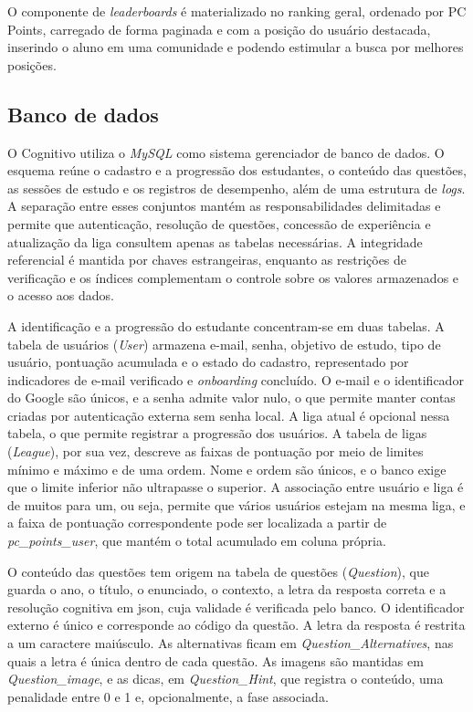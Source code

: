 O componente de \textit{leaderboards} é materializado no ranking geral, ordenado
por PC Points, carregado de forma paginada e com a posição do usuário destacada, inserindo o aluno em uma comunidade e podendo estimular a busca por
melhores posições.

\subsection{Banco de dados}
\label{sec:banco-de-dados}

O Cognitivo utiliza o \textit{MySQL} como sistema gerenciador de banco de dados. 
O esquema reúne o cadastro e a progressão dos
estudantes, o conteúdo das questões, as sessões de estudo e os registros de
desempenho, além de uma estrutura de \textit{logs}. A separação entre esses
conjuntos mantém as responsabilidades delimitadas e permite que autenticação,
resolução de questões, concessão de experiência e atualização da liga consultem
apenas as tabelas necessárias. A integridade referencial é mantida por chaves
estrangeiras, enquanto as restrições de verificação e os índices complementam o
controle sobre os valores armazenados e o acesso aos dados.

A identificação e a progressão do estudante concentram-se em duas tabelas. A
tabela de usuários (\textit{User}) armazena e-mail, senha, objetivo de estudo,
tipo de usuário, pontuação acumulada e o estado do cadastro, representado por
indicadores de e-mail verificado e \textit{onboarding} concluído. O e-mail e o
identificador do Google são únicos, e a senha admite valor nulo, o que permite
manter contas criadas por autenticação externa sem senha local. A liga atual é
opcional nessa tabela, o que permite registrar a progressão dos usuários.
A tabela de ligas (\textit{League}), por sua vez, descreve as faixas de
pontuação por meio de limites mínimo e máximo e de uma ordem. Nome e ordem são
únicos, e o banco exige que o limite inferior não ultrapasse o superior. A associação entre
usuário e liga é de muitos para um, ou seja, permite que vários usuários estejam na mesma liga,
e a faixa de pontuação correspondente pode ser localizada
a partir de \textit{pc\_points\_user}, que mantém o total acumulado em coluna
própria.

O conteúdo das questões tem origem na tabela de questões (\textit{Question}), que
guarda o ano, o título, o enunciado, o contexto, a letra
da resposta correta e a resolução cognitiva em \gls{json}, cuja validade é
verificada pelo banco. O identificador externo é único e corresponde ao código da
questão. A letra da resposta é restrita a um caractere
maiúsculo. As alternativas ficam em \textit{Question\_Alternatives}, nas quais a letra é única
dentro de cada questão. As imagens são mantidas em \textit{Question\_image}, e as
dicas, em \textit{Question\_Hint}, que registra o conteúdo, uma penalidade entre
0 e 1 e, opcionalmente, a fase associada.

